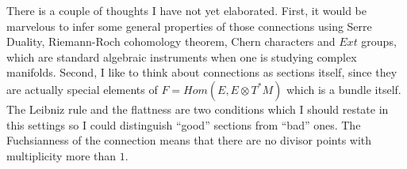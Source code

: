 \documentclass[../main.tex]{subfiles}
\begin{document}
    There is a couple of thoughts I have not yet elaborated.
    First, it would be marvelous to infer some general properties
    of those connections
    using Serre Duality, Riemann-Roch cohomology theorem, Chern characters
    and $Ext$ groups, which are standard algebraic
    instruments when one is studying complex manifolds.
    Second, I like to think about connections as
        sections itself, since they are actually special elements of
        $F = Hom(E, E \otimes T^*M )$ which is a bundle itself.
        The Leibniz rule and the flattness are two conditions which I
    should restate in this settings so I could distinguish \enquote{good}
    sections from \enquote{bad} ones.
    The Fuchsianness of the connection means that there are no divisor points
    with multiplicity more than $1$.
%
\end{document}
